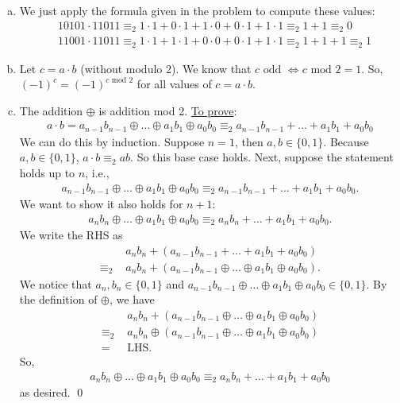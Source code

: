 \documentclass{book}
\theoremstyle{definition}
\newcommand{\nn}{\nonumber}
\newcommand{\lp}{\left(}
\newcommand{\rp}{\right)}
\begin{document}
\begin{enumerate}[(a)]
	\item We just apply the formula given in the problem to compute these values:
	\begin{align}
	&10101 \cdot 11011 \equiv_2 1\cdot 1 + 0\cdot 1 + 1\cdot 0 + 0 \cdot 1 + 1 \cdot 1 \equiv_2 1 + 1 \equiv_2 \boxed{0}\nn\\
	&11001 \cdot 11011 \equiv_2 1\cdot 1 + 1 \cdot 1 + 0 \cdot 0 + 0 \cdot 1 + 1\cdot 1 \equiv_2 1 + 1 + 1\equiv_2 \boxed{1}\nn
	\end{align} 
	\item Let  $c = a\cdot b$ (without modulo 2). We know that $c \text{ odd } \iff c\text{ mod } 2 = 1$. So, $(-1)^c = (-1)^{c\text{ mod } 2}$ for all values of $c = a\cdot b$.  

	\item The addition $\oplus$ is addition mod 2. \underline{To prove}:
	\begin{align}
	a\cdot b = a_{n-1}b_{n-1} \oplus\dots \oplus a_1b_1 \oplus a_0b_0 \equiv_2 a_{n-1}b_{n-1} + \dots + a_1b_1 + a_0b_0
	\end{align}
	We can do this by induction. Suppose $n=1$, then $a,b\in \{0,1\}$. Because $a,b\in \{0,1\}$, $a\cdot b \equiv_2 ab$. So this base case holds. Next, suppose the statement holds up to $n$, i.e.,
	\begin{align}
	a_{n-1}b_{n-1} \oplus\dots \oplus a_1b_1 \oplus a_0b_0 \equiv_2 a_{n-1}b_{n-1} + \dots + a_1b_1 + a_0b_0.
	\end{align}  
	We want to show it also holds for $n+1$:
	\begin{align}
	a_{n}b_{n} \oplus\dots \oplus a_1b_1 \oplus a_0b_0 \equiv_2 a_{n}b_{n} + \dots + a_1b_1 + a_0b_0.
	\end{align} 
	We write the RHS as
	\begin{align}
	&a_nb_n + \lp a_{n-1}b_{n-1} + \dots + a_1b_1 + a_0b_0 \rp \nn\\
	\equiv_2\,\,& a_nb_n + \lp a_{n-1}b_{n-1} \oplus\dots \oplus a_1b_1 \oplus a_0b_0 \rp.
	\end{align}
	We notice that $a_n,b_n\in \{0,1\}$ and $a_{n-1}b_{n-1} \oplus\dots \oplus a_1b_1 \oplus a_0b_0 \in \{0,1\}$. By the definition of $\oplus$, we have
	\begin{align}
	&a_nb_n + \lp a_{n-1}b_{n-1} \oplus\dots \oplus a_1b_1 \oplus a_0b_0 \rp\nn\\ 
	\equiv_2\,\,& a_nb_n \oplus \lp a_{n-1}b_{n-1} \oplus\dots \oplus a_1b_1 \oplus a_0b_0 \rp\nn\\
	=\,\,&\text{LHS}.
	\end{align}
	So, 
	\begin{align}
	a_{n}b_{n} \oplus\dots \oplus a_1b_1 \oplus a_0b_0 \equiv_2 a_{n}b_{n} + \dots + a_1b_1 + a_0b_0
	\end{align}
	as desired. \qed
	
	
	
	
	
	
	
	

	
\end{enumerate}
\end{document}
